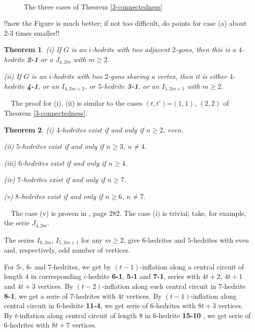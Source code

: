 \documentclass[12pt]{article}
\newtheorem{theorem}{Theorem}
\newcommand{\proof}{\noindent{\bf Proof.}\ \ }
\begin{document}
\begin{figure}
\centering
\mbox{
}
\caption{The three cases of Theorem \ref{3-connectedness}}
\label{fig:TheThreeCases}
\end{figure}
!!now the Figure is much better; if not too difficult, do points for case (a)
about 2-3 times smaller!!


\begin{theorem}
(i) If $G$ is an $i$-hedrite with two adjacent $2$-gons, then 
this is a $4$-hedrite {\bf 2-1} or a $J_{4,2m}$ with $m\geq 2$.

(ii) If $G$ is an $i$-hedrite with two $2$-gons sharing a vertex, then 
it is either $4$-hedrite {\bf 4-1}, or an $I_{4,2m+2}$, or $5$-hedrite 
{\bf 3-1}, or an $I_{5,2m+1}$ with $m\geq 2$.

\end{theorem}

\proof The proof for (i), (ii) is similar to the cases $(t,t')$=$(1,1)$, $(2,2)$ of Theorem \ref{3-connectedness}.




\begin{theorem}

(i) $4$-hedrites exist if and only if $n\geq 2$, even.

(ii) $5$-hedrites exist if and only if $n\geq 3$, $n\not= 4$.

(iii) $6$-hedrites exist if and only if $n\geq 4$.

(iv) $7$-hedrites exist if and only if $n\geq 7$.

(v) $8$-hedrites exist if and only if $n\geq 6$, $n\not= 7$.

\end{theorem}
\proof The case (v) is proven in \cite{Gr}, page 282.
The case (i) is trivial; take, for example, the serie $J_{4,2m}$.

The series $I_{6,2m}$, $I_{5,2m+1}$ for any $m \ge 2$, give $6$-hedrites
and $5$-hedrites with even and, respectively, odd number of vertices.



For $5$-, $6$- and $7$-hedrites, we 
get by $(t-1)$-inflation
along a central circuit of length $4$ in corresponding
$i$-hedrite {\bf 6-1}, {\bf 5-1} and {\bf 7-1},
series with $4t+2$, $4t+1$ and $4t+3$ vertices. 
By $(t-2)$-inflation
along such central circuit in $7$-hedrite {\bf 8-1}, we get a serie of
$7$-hedrites with $4t$ vertices.
By $(t-1)$-inflation along central circuit in $6$-hedrite {\bf 11-4}, we
get serie of $6$-hedrites with $8t+3$ vertices.
By $t$-inflation along central circuit of length $8$ in 
$6$-hedrite {\bf 15-10 }, 
we get serie of $6$-hedrites with $8t+7$ vertices.
\end{document}
